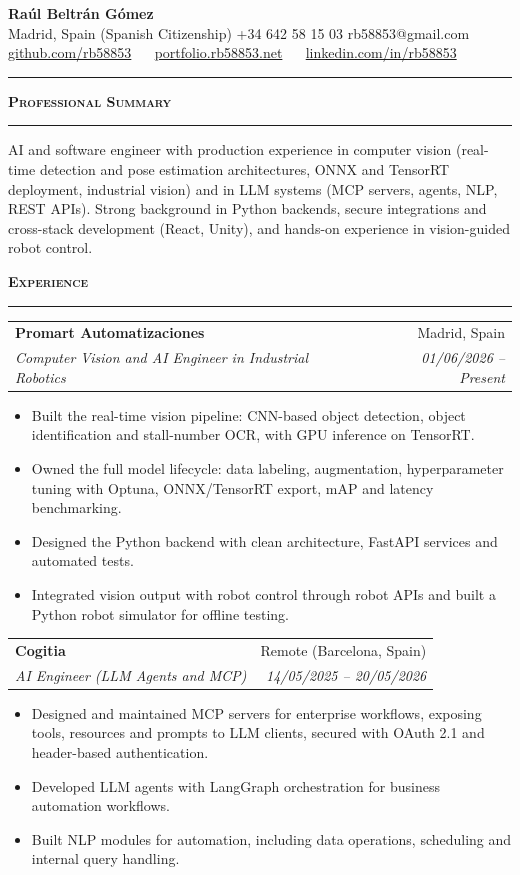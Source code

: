 \documentclass[11pt,a4paper]{article}
\makeatletter
\newcommand{\cvsection}[1]{
  \vspace{0.45em}
  {\large\textbf{\textcolor{primary}{\textsc{#1}}}}\\[-0.35em]
  {\color{rulegray}\rule{\linewidth}{0.6pt}}
  \vspace{0.15em}
}
\newcommand{\cvjob}[4]{
  \begin{tabularx}{\linewidth}{@{}Xr@{}}
    \textbf{#1} & \textcolor{textmuted}{#2}\\
    \textit{#3} & \textit{\textcolor{textmuted}{#4}}
  \end{tabularx}
}
\newcommand{\tightitems}{
  \setlength{\itemsep}{0.1em}
  \setlength{\parskip}{0em}
  \setlength{\parsep}{0em}
}
\makeatother
\begin{document}
\pagestyle{empty}
\color{textmain}

{\Huge\textbf{\textcolor{primary}{Ra\'ul Beltr\'an G\'omez}}}\\[-0.15em]
{\small \textcolor{textmuted}{Madrid, Spain (Spanish Citizenship) \textbar{} +34 642 58 15 03 \textbar{} rb58853@gmail.com}}\\
{\small
\href{https://github.com/rb58853}{github.com/rb58853}
\textcolor{textmuted}{\ \textbar\ }
\href{https://portfolio.rb58853.net}{portfolio.rb58853.net}
\textcolor{textmuted}{\ \textbar\ }
\href{https://www.linkedin.com/in/rb58853/}{linkedin.com/in/rb58853}}

\vspace{0.2em}
{\color{rulegray}\rule{\linewidth}{0.8pt}}

\cvsection{Professional Summary}
AI and software engineer with production experience in computer vision (real-time detection and pose estimation architectures, ONNX and TensorRT deployment, industrial vision) and in LLM systems (MCP servers, agents, NLP, REST APIs). Strong background in Python backends, secure integrations and cross-stack development (React, Unity), and hands-on experience in vision-guided robot control.

\cvsection{Experience}
\cvjob{Promart Automatizaciones}{Madrid, Spain}{Computer Vision and AI Engineer in Industrial Robotics}{01/06/2026 -- Present}
\begin{itemize}
  \tightitems
  \item Built the real-time vision pipeline: CNN-based object detection, object identification and stall-number OCR, with GPU inference on TensorRT.
  \item Owned the full model lifecycle: data labeling, augmentation, hyperparameter tuning with Optuna, ONNX/TensorRT export, mAP and latency benchmarking.
  \item Designed the Python backend with clean architecture, FastAPI services and automated tests.
  \item Integrated vision output with robot control through robot APIs and built a Python robot simulator for offline testing.
\end{itemize}
\vspace{0.2em}

\cvjob{Cogitia}{Remote (Barcelona, Spain)}{AI Engineer (LLM Agents and MCP)}{14/05/2025 -- 20/05/2026}
\begin{itemize}
  \tightitems
  \item Designed and maintained MCP servers for enterprise workflows, exposing tools, resources and prompts to LLM clients, secured with OAuth 2.1 and header-based authentication.
  \item Developed LLM agents with LangGraph orchestration for business automation workflows.
  \item Built NLP modules for automation, including data operations, scheduling and internal query handling.
\end{itemize}
\vspace{0.2em}
\end{document}
